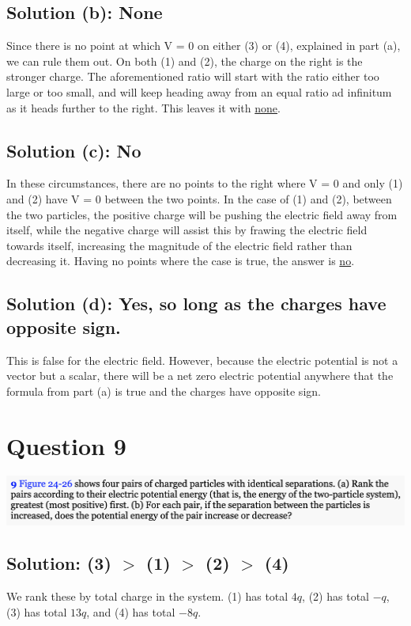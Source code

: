 \documentclass[12pt]{article}
\begin{document}
\subsection{Solution (b): None}
Since there is no point at which V = 0 on either (3) or (4), explained in part (a), we can rule them out. 
On both (1) and (2), the charge on the right is the stronger charge.
The aforementioned ratio will start with the ratio either too large or too small, and will keep heading away from an equal ratio ad infinitum as it heads further to the right. 
This leaves it with \underline{none}.

\subsection{Solution (c): No}
In these circumstances, there are no points to the right where V = 0 and only (1) and (2) have V = 0 between the two points. 
In the case of (1) and (2), between the two particles, the positive charge will be pushing the electric field away from itself, while the negative charge will assist this by frawing the electric field towards itself, increasing the magnitude of the electric field rather than decreasing it.
Having no points where the case is true, the answer is \underline{no}.

\subsection{Solution (d): Yes, so long as the charges have opposite sign.}
This is false for the electric field. 
However, because the electric potential is not a vector but a scalar, there will be a net zero electric potential anywhere that the formula from part (a) is true and the charges have opposite sign.
\pagebreak

\section{Question 9}
\includegraphics[width=\textwidth]{picture_3.png}

\subsection{Solution: (3) $>$ (1) $>$ (2) $>$ (4)}
We rank these by total charge in the system. 
(1) has total $4q$, (2) has total $-q$, (3) has total $13q$, and (4) has total $-8q$.
\end{document}

